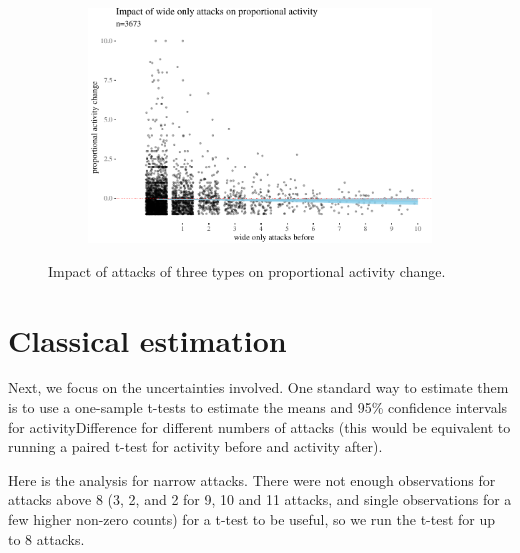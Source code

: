 \documentclass[10pt,]{scrartcl}
\begin{document}
\begin{figure}
\vspace{3mm}
\begin{subfigure}[b]{0.75\textwidth}

\begin{center}\includegraphics[width=1\linewidth]{redditAnalysisWalkthrough_files/figure-latex/unnamed-chunk-19-1} \end{center}

\end{subfigure}


\caption{Impact of attacks of three types on proportional activity change.}
\label{fig:propActivity}
\end{figure}

\section{Classical estimation}

Next, we focus on the uncertainties involved. One standard way to
estimate them is to use a one-sample t-tests to estimate the means and
95\% confidence intervals for \textsf{activityDifference} for different
numbers of attacks (this would be equivalent to running a paired t-test
for activity before and activity after).

Here is the analysis for narrow attacks. There were not enough
observations for attacks above 8 (3, 2, and 2 for 9, 10 and 11 attacks,
and single observations for a few higher non-zero counts) for a t-test
to be useful, so we run the t-test for up to 8 attacks.

\footnotesize
\end{document}
